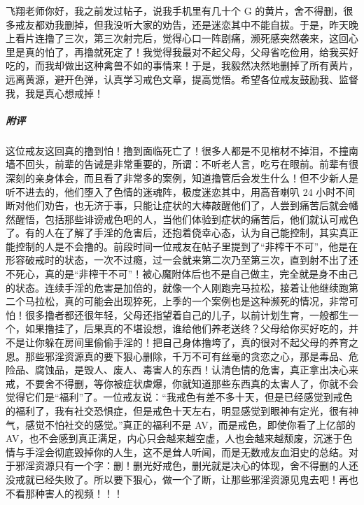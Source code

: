 \begin{case}
    飞翔老师你好，我之前发过帖子，说我手机里有几十个 G 的黄片，舍不得删，很多戒友都劝我删掉，但我没听大家的劝告，还是迷恋其中不能自拔。于是，昨天晚上看片连撸了三次，第三次射完后，觉得心口一阵剧痛，濒死感突然袭来，这回心里是真的怕了，再撸就死定了！我觉得我最对不起父母，父母省吃俭用，给我买好吃的，而我却做出这种禽兽不如的事情来！于是，我毅然决然地删掉了所有黄片，远离黄源，避开色弹，认真学习戒色文章，提高觉悟。希望各位戒友鼓励我、监督我，我是真心想戒掉！
    \subparagraph{附评} 这位戒友这回真的撸到怕！撸到面临死亡了！很多人都是不见棺材不掉泪，不撞南墙不回头，前辈的告诫是非常重要的，所谓：不听老人言，吃亏在眼前。前辈有很深刻的亲身体会，而且看了非常多的案例，知道撸管后会发生什么！但不少新人是听不进去的，他们堕入了色情的迷魂阵，极度迷恋其中，用高音喇叭 24 小时不间断对他们劝告，也无济于事，只能让症状的大棒敲醒他们了，人尝到痛苦后就会幡然醒悟，包括那些诽谤戒色吧的人，当他们体验到症状的痛苦后，他们就认可戒色了。有的人在了解了手淫的危害后，还抱着侥幸心态，认为自己能控制，其实真正能控制的人是不会撸的。前段时间一位戒友在帖子里提到了“非榨干不可”，他是在形容破戒时的状态，一次不过瘾，过一会就来第二次乃至第三次，直到射不出了还不死心，真的是“非榨干不可”！被心魔附体后也不是自己做主，完全就是身不由己的状态。连续手淫的危害是加倍的，就像一个人刚跑完马拉松，接着让他继续跑第二个马拉松，真的可能会出现猝死，上季的一个案例也是这种濒死的情况，非常可怕！很多撸者都还很年轻，父母还指望着自己的儿子，以前计划生育，一般都生一个，如果撸挂了，后果真的不堪设想，谁给他们养老送终？父母给你买好吃的，并不是让你躲在房间里偷偷手淫的！把自己身体撸垮了，真的很对不起父母的养育之恩。那些邪淫资源真的要下狠心删除，千万不可有丝毫的贪恋之心，那是毒品、危险品、腐蚀品，是毁人、废人、毒害人的东西！认清色情的危害，真正拿出决心来戒，不要舍不得删，等你被症状虐爆，你就知道那些东西真的太害人了，你就不会觉得它们是“福利”了。一位戒友说：“我戒色有差不多十天，但是已经感觉到戒色的福利了，我有社交恐惧症，但是戒色十天左右，明显感觉到眼神有定光，很有神气，感觉不怕社交的感觉。”真正的福利不是 AV，而是戒色，即使你看了上亿部的 AV，也不会感到真正满足，内心只会越来越空虚，人也会越来越颓废，沉迷于色情与手淫会彻底毁掉你的人生，这不是耸人听闻，而是无数戒友血泪史的总结。对于邪淫资源只有一个字：删！删光好戒色，删光就是决心的体现，舍不得删的人还没戒就已经失败了。所以要下狠心，做一个了断，让那些邪淫资源见鬼去吧！再也不看那种害人的视频！！！
\end{case}

